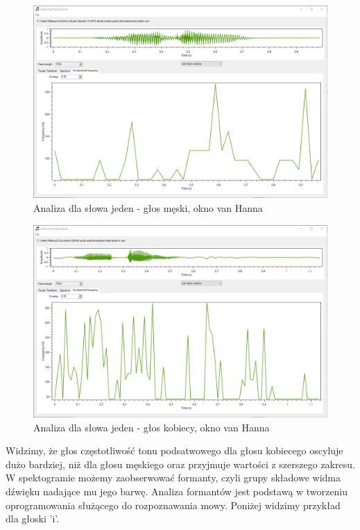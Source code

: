 \documentclass{article}
\begin{document}
\begin{figure}[H]
\includegraphics[width=6in]{scr16.png}
\centering
\caption{Analiza dla słowa jeden - głos męski, okno van Hanna}
\end{figure}

\begin{figure}[H]
\includegraphics[width=6in]{scr17.png}
\centering
\caption{Analiza dla słowa jeden - głos kobiecy, okno van Hanna}
\end{figure}

Widzimy, że głos częstotliwość tonu podsatwowego dla głosu kobiecego oscyluje dużo bardziej, niż dla głosu męskiego oraz przyjmuje wartości z szerszego zakresu.
\\

W spektogramie możemy zaobserwować formanty, czyli grupy składowe widma dźwięku nadające mu jego barwę. Analiza formantów jest podstawą w tworzeniu oprogramowania służącego do rozpoznawania mowy. Poniżej widzimy przykład dla głoski 'i'.
\end{document}
